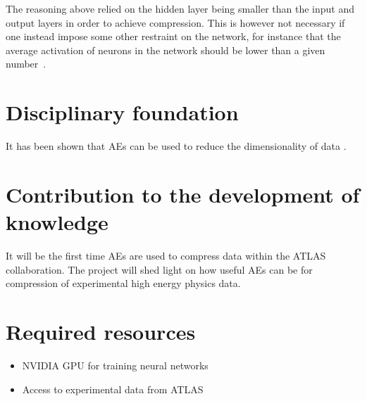 \documentclass[11pt]{article}
\begin{document}
The reasoning above relied on the hidden layer being smaller than the input and output layers in order to achieve compression. This is however not necessary if one instead impose some other restraint on the network, for instance that the average activation of neurons in the network should be lower than a given number~\cite{ng_autoenc}.

\section{Disciplinary foundation}
It has been shown that AEs can be used to reduce the dimensionality of data \cite{hinton}. 

\section{Contribution to the development of knowledge}

It will be the first time AEs are used to compress data within the ATLAS collaboration. The project will shed light on how useful AEs can be for compression of experimental high energy physics data.

\section{Required resources}

\begin{itemize}
    \item NVIDIA GPU for training neural networks
    \item Access to experimental data from ATLAS
\end{itemize}






\end{document}
